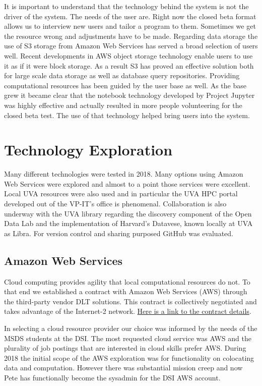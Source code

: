 It is important to understand that the technology behind the system is not the driver of the system. The needs of the user are. Right now the closed beta format allows us to interview new users and tailor a program to them. Sometimes we get the resource wrong and adjustments have to be made.
Regarding data storage the use of S3 storage from Amazon Web Services has served a broad selection of users well. Recent developments in AWS object storage technology enable users to use it as if it were block storage. As a result S3 has proved an effective solution both for large scale data storage as well as database query repositories.
Providing computational resources has been guided by the user base as well. As the base grew it became clear that the notebook technology developed by Project Jupyter was highly effective and actually resulted in more people volunteering for the closed beta test. The use of that technology helped bring users into the system.


\section{Technology Exploration}
\label{techsolu}
Many different technologies were tested in 2018. Many options using Amazon Web Services were explored and almost to a point those services were excellent. Local UVA resources were also used and in particular the UVA HPC portal developed out of the VP-IT's office is phenomenal. Collaboration is also underway with the UVA library regarding the discovery component of the Open Data Lab and the implementation of Harvard's Datavese, known locally at UVA as Libra. For version control and sharing purposed GitHub was evaluated.

\subsection{Amazon Web Services}
Cloud computing provides agility that local computational resources do not. To that end we established a contract with Amazon Web Services (AWS) through the third-party vendor DLT solutions. This contract is collectively negotiated and takes advantage of the Internet-2 network. \href{https://www.internet2.edu/products-services/cloud-services-applications/amazon-web-services/}{Here is a link to the contract details}.

In selecting a cloud resource provider our choice was informed by the needs of the  MSDS students at the DSI. The most requested cloud service was AWS and the plurality of job postings that are interested in cloud skills prefer AWS. During 2018 the initial scope of the AWS exploration was for functionality on colocating data and computation. However there was substantial mission creep and now Pete has functionally become the sysadmin for the DSI AWS account.

